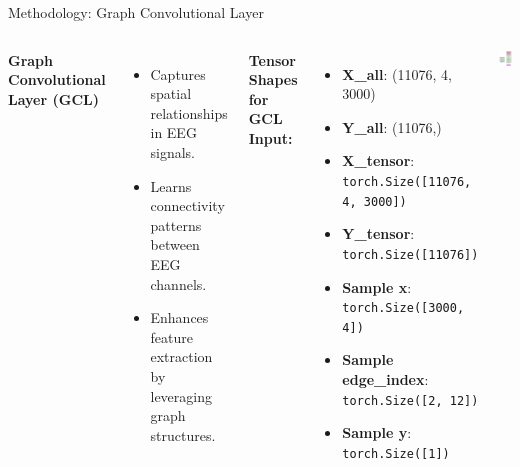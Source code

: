 \begin{frame}{Methodology: Graph Convolutional Layer}
    \begin{columns}[c] %

        
        \textbf{Graph Convolutional Layer (GCL)}
        \vspace{5pt}
        \begin{itemize}
            \item Captures spatial relationships in EEG signals.
            \item Learns connectivity patterns between EEG channels.
            \item Enhances feature extraction by leveraging graph structures.
        \end{itemize}

        \vspace{8pt} %
        \textbf{Tensor Shapes for GCL Input:}
        \vspace{3pt}
        \begin{itemize}
            \item \textbf{X\_all}: (11076, 4, 3000)
            \item \textbf{Y\_all}: (11076,)
            \item \textbf{X\_tensor}: \texttt{torch.Size([11076, 4, 3000])}
            \item \textbf{Y\_tensor}: \texttt{torch.Size([11076])}
            \item \textbf{Sample x}: \texttt{torch.Size([3000, 4])}
            \item \textbf{Sample edge\_index}: \texttt{torch.Size([2, 12])}
            \item \textbf{Sample y}: \texttt{torch.Size([1])}
        \end{itemize}

        \centering
        \vspace{-10pt} %
        \includegraphics[width=0.6\linewidth]{figures/Graph Convolution Neural Network.png} %


\end{columns}
\end{frame}
